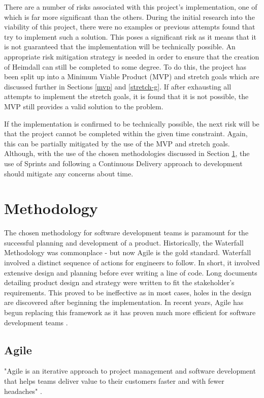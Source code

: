 \documentclass{article}
\begin{document}
There are a number of risks associated with this project's implementation, one of which is far more significant than the others. During the initial research into the viability of this project, there were no examples or previous attempts found that try to implement such a solution. This poses a significant risk as it means that it is not guaranteed that the implementation will be technically possible. An appropriate risk mitigation strategy is needed in order to ensure that the creation of Heimdall can still be completed to some degree. To do this, the project has been split up into a Minimum Viable Product (MVP) and stretch goals which are discussed further in Sections \ref{mvp} and \ref{stretch-g}. If after exhausting all attempts to implement the stretch goals, it is found that it is not possible, the MVP still provides a valid solution to the problem. \\\par If the implementation is confirmed to be technically possible, the next risk will be that the project cannot be completed within the given time constraint. Again, this can be partially mitigated by the use of the MVP and stretch goals. Although, with the use of the chosen methodologies discussed in Section \ref{methodology}, the use of Sprints and following a Continuous Delivery approach to development should mitigate any concerns about time.



 
\section{Methodology} \label{methodology}
The chosen methodology for software development teams is paramount for the successful planning and development of a product. Historically, the Waterfall Methodology was commonplace - but now Agile is the gold standard. Waterfall involved a distinct sequence of actions for engineers to follow. In short, it involved extensive design and planning before ever writing a line of code. Long documents detailing product design and strategy were written to fit the stakeholder's requirements. This proved to be ineffective as in most cases, holes in the design are discovered after beginning the implementation. In recent years, Agile has begun replacing this framework as it has proven much more efficient for software development teams \cite{agile-waterfall}.



\subsection{Agile} \label{agile}
"Agile is an iterative approach to project management and software development that helps teams deliver value to their customers faster and with fewer headaches" \cite{what-is-agile}. 
\end{document}
